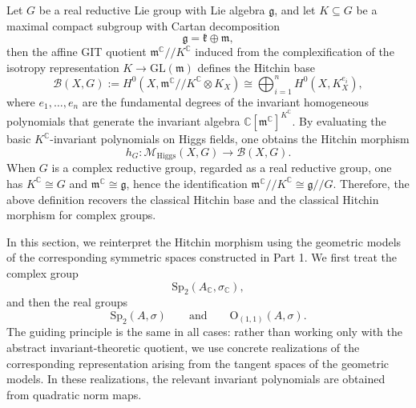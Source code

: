 \documentclass[oneside,11pt]{amsart}
\theoremstyle{definition}
\theoremstyle{remark}
\numberwithin{thm}{section}
\numberwithin{equation}{section}
\begin{document}
Let $G$ be a real reductive Lie group with Lie algebra $\mathfrak g$, and let $K\subseteq G$  be a maximal compact subgroup with Cartan decomposition
\[
\mathfrak g=\mathfrak k\oplus\mathfrak m,
\]
then the affine GIT quotient $\mathfrak{m}^{\mathbb C}/\!\!/K^{\mathbb C}$ induced from the complexification of the isotropy representation $K\to\mathrm{GL}(\mathfrak{m})$ defines the Hitchin base
\[
\mathcal B(X,G):=H^0(X,\mathfrak{m}^{\mathbb C}/\!\!/K^{\mathbb C}\otimes K_X)\cong\bigoplus_{i=1}^{n} H^0(X,K_X^{e_i}),
\]
 where $e_1,\dots,e_n$ are the fundamental degrees of the invariant homogeneous polynomials that generate the invariant algebra $\mathbb{C}[\mathfrak{m}^{\mathbb C}]^{K^{\mathbb C}}$. By evaluating the basic $K^{\mathbb C}$-invariant polynomials on Higgs fields, one obtains the Hitchin morphism
\[
h_G:\mathcal M_{\mathrm{Higgs}}(X,G)\longrightarrow \mathcal B(X,G).
\]
When $G$ is a complex reductive group, regarded as a real reductive group, one has $K^{\mathbb C}\cong G$ and $\mathfrak{m}^{\mathbb C}\cong\mathfrak{g}$,  hence the identification $\mathfrak{m}^{\mathbb C}/\!\!/K^{\mathbb C}\cong\mathfrak g/\!\!/G$. Therefore, the above definition recovers the classical Hitchin base and the classical Hitchin morphism for complex groups. 

In this section, we reinterpret the Hitchin morphism using the geometric models of the corresponding symmetric spaces constructed in Part 1. We first treat the complex group
\[
\mathrm{Sp}_2(A_{\mathbb C},\sigma_{\mathbb C}),
\]
and then the real groups
\[
\mathrm{Sp}_2(A,\sigma) \qquad \text{and} \qquad \mathrm O_{(1,1)}(A,\sigma).
\]
The guiding principle is the same in all cases: rather than working only with the abstract invariant-theoretic quotient, we use concrete realizations of the corresponding representation arising from the tangent spaces of the geometric models. In these realizations, the relevant invariant polynomials are obtained from quadratic norm maps.
\end{document}
